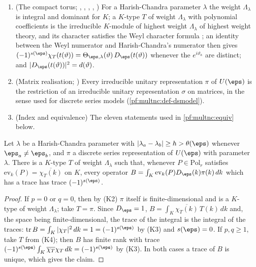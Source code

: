 \begin{enumerate}[label=(K\arabic*)]
\item (The compact torus; ,
,
, ,
) For a Harish-Chandra parameter $\lambda$ the weight $\Lambda_\lambda$ is integral
and dominant for $K$; a $K$-type $T$ of weight $\Lambda_\lambda$ with polynomial coefficients is the irreducible $K$-module
of highest weight $\Lambda_\lambda$ of highest weight theory, and its character satisfies the Weyl character formula
\cite{Weyl1946}; an identity between the Weyl numerator and Harish-Chandra's numerator then gives
$(-1)^{s(\eps)}\chi_T(t(\vartheta))=\Theta_{\eps,\lambda}(\vartheta)\,D_\eps(t(\vartheta))$ whenever the $e^{i\vartheta_a}$
are distinct; and $|D_\eps(t(\vartheta))|^2=d(\vartheta)$.
\item (Matrix realisation; ) Every irreducible unitary
representation $\pi$ of $U(\eps)$ is the restriction of an irreducible unitary representation $\sigma$ on matrices, in
the sense used for discrete series models (\cref{pf:multnc:def-dsmodel}).
\item (Index and equivalence) The eleven statements used in \cref{pf:multnc:equiv} below.
\end{enumerate}

\begin{lemma}\label{pf:multnc:index}
Let $\lambda$ be a Harish-Chandra parameter with $|\lambda_a-\lambda_b|\ge h>\theta(\eps)$ whenever $\eps_a\ne\eps_b$, and
$\pi$ a discrete series representation of $U(\eps)$ with parameter $\lambda$. There is a $K$-type $T$ of weight
$\Lambda_\lambda$ such that, whenever $P\in\mathrm{Pol}_r$ satisfies $\mathrm{ev}_k(P)=\overline{\chi_T(k)}$ on $K$, every
operator $B=\int_K\mathrm{ev}_k(P)D_\eps(k)\pi(k)\,dk$ which has a trace has trace $(-1)^{s(\eps)}$.
\end{lemma}

\begin{proof}
If $p=0$ or $q=0$, then by (K2) $\pi$ itself is finite-dimensional and is a $K$-type of weight $\Lambda_\lambda$; take
$T=\pi$. Since $D_\eps=1$, $B=\int_K\overline{\chi_T(k)}\,T(k)\,dk$ and, the space being finite-dimensional, the trace of
the integral is the integral of the traces: $\mathrm{tr}\,B=\int_K|\chi_T|^2\,dk=1=(-1)^{s(\eps)}$ by (K3) and
$s(\eps)=0$. If $p,q\ge1$, take $T$ from (K4); then $B$ has finite rank with trace
$(-1)^{s(\eps)}\int_K\overline{\chi_T}\chi_T\,dk=(-1)^{s(\eps)}$ by (K3). In both cases a trace of $B$ is unique, which
gives the claim.
\end{proof}

